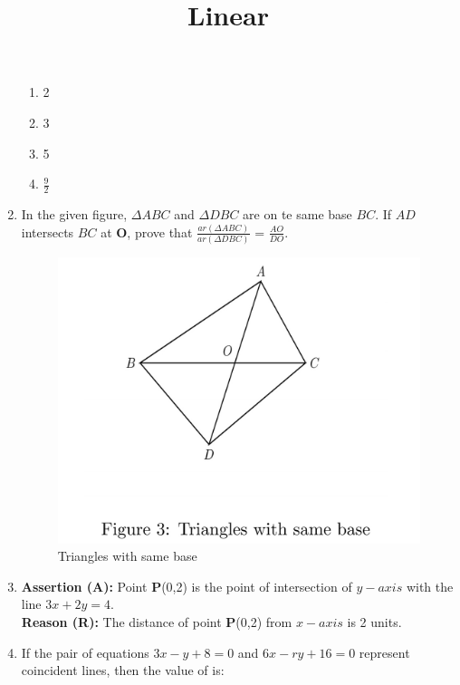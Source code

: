 \documentclass{article}
\let\vec\mathbf
\begin{document}
\begin{enumerate}
			\begin{enumerate}
				\item 2
				\item 3
				\item 5
				\item $\frac{9}{2}$
			\end{enumerate}

		\newpage

	\item In the given figure, $\Delta ABC$ and $\Delta DBC$ are on te same base $BC$. If $AD$ intersects $BC$ at $\vec{O}$, prove that $\frac { ar(\Delta ABC)}{ar (\Delta DBC)}$ = $\frac{AO}{DO}$.

		\begin{figure}[h!]
			\centering
			\includegraphics [width=\columnwidth] {figs/fig3.jpg}
			\caption{Triangles with same base}
			\label{fig:fig3.jpg}
		\end{figure}
\pagebreak

\title{\textbf{Linear}}
\date{}
\maketitle

	\item \textbf{Assertion (A):} Point $\vec{P}$(0,2) is the point of intersection of $y-axis$ with  the line $3x+2y=4$.\\
		\textbf{Reason (R):} The distance of point $\vec{P}$(0,2) from $x-axis$ is 2 units.


	\item If the pair of equations $3x-y+8=0$ and $6x-ry+16=0$ represent coincident lines, then the value of  is:


\end{enumerate}
\end{document}
